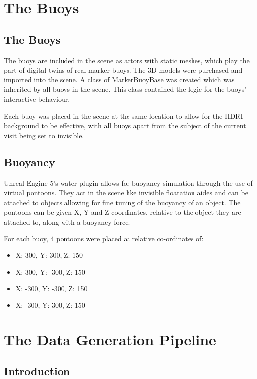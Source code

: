 \documentclass[10pt,twocolumn,letterpaper]{article}
\begin{document}
\section{The Buoys}

\subsection{The Buoys} \label{sec:the_buoys}

The buoys are included in the scene as actors with static meshes, which play the part of digital twins of real marker buoys. The 3D models were purchased and imported into the scene. A class of MarkerBuoyBase was created which was inherited by all buoys in the scene. This class contained the logic for the buoys' interactive behaviour.

Each buoy was placed in the scene at the same location to allow for the HDRI background to be effective, with all buoys apart from the subject of the current visit being set to invisible.

\subsection{Buoyancy}

Unreal Engine 5's water plugin allows for buoyancy simulation through the use of virtual pontoons. They act in the scene like invisible floatation aides and can be attached to objects allowing for fine tuning of the buoyancy of an object. The pontoons can be given X, Y and Z coordinates, relative to the object they are attached to, along with a buoyancy force.

For each buoy, 4 pontoons were placed at relative co-ordinates of:

\begin{itemize}
    \item X: 300, Y: 300, Z: 150
    \item X: 300, Y: -300, Z: 150
    \item X: -300, Y: -300, Z: 150
    \item X: -300, Y: 300, Z: 150
\end{itemize}

\section{The Data Generation Pipeline}

\subsection{Introduction}
\end{document}

